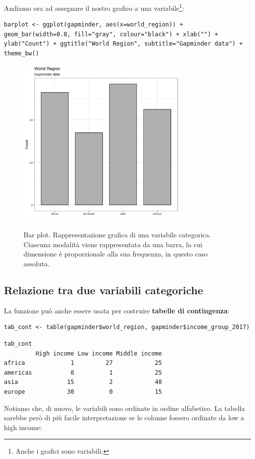 \noindent Andiamo ora ad assegnare il nostro grafico a una variabile\footnote{Anche i grafici sono variabili.}:

\begin{lstlisting}[style=Rstylescript]
barplot <- ggplot(gapminder, aes(x=world_region)) + geom_bar(width=0.8, fill="gray", colour="black") + xlab("") + ylab("Count") + ggtitle("World Region", subtitle="Gapminder data") + theme_bw()
\end{lstlisting}

\begin{figure}[h]
 \centering
  \includegraphics[width=0.75\textwidth]{images/bar_plot.png}
  \label{fig:barplot}
 \caption{Bar plot. Rappresentazione grafica di una variabile categorica. Ciascuna modalit\`a viene rappresentata da una barra, la cui dimensione \`e proporzionale alla sua frequenza, in questo caso assoluta.}
\end{figure}


\subsection{Relazione tra due variabili categoriche}

La funzione  pu\`o anche essere usata per costruire \textbf{tabelle di contingenza}:

\begin{lstlisting}[style=Rstylescript]
tab_cont <- table(gapminder$world_region, gapminder$income_group_2017)
\end{lstlisting}

\begin{lstlisting}[style=Rstyle]
tab_cont	
         High income Low income Middle income
africa             1         27            25
americas           8          1            25
asia              15          2            40
europe            30          0            15
\end{lstlisting}
%
Notiamo che, di nuovo, le variabili sono ordinate in ordine alfabetico. La tabella sarebbe per\`o di pi\`u facile interpretazione se le colonne fossero ordinate da low a high income:

